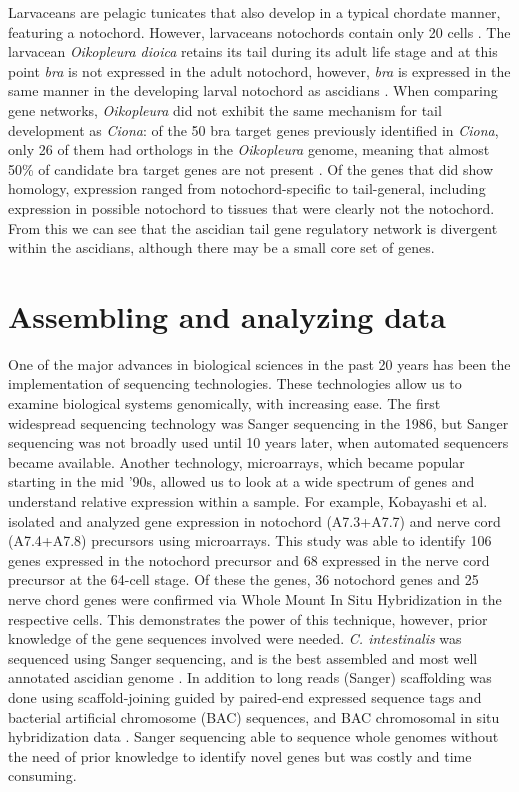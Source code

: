 Larvaceans are pelagic tunicates that also develop in a typical chordate manner, featuring  a notochord. However, larvaceans notochords contain only 20 cells \cite{seo_miniature_2001,denoeud_plasticity_2010}. The larvacean  \textit{Oikopleura dioica} retains its tail during its adult life stage and at this point \textit{bra} is not expressed in the adult notochord, however, \textit{bra} is expressed in the same manner in the developing larval notochord as ascidians \cite{bassham_brachyury_2000,nishida_development_2008}. When comparing gene networks, \textit{Oikopleura} did not exhibit the same mechanism for tail development as \textit{Ciona}: of the 50 bra target genes previously identified in \textit{Ciona}, only 26 of them had orthologs in the \textit{Oikopleura} genome, meaning that almost 50\% of candidate bra target  genes are not present \cite{kugler_evolutionary_2011}. Of the genes that did show homology, expression ranged from notochord-specific to tail-general, including expression in possible notochord to tissues that were clearly not the notochord. From this we can see that the ascidian tail gene regulatory network is divergent within the ascidians, although there may be a small core set of genes.

\section{Assembling and analyzing data}

One of the major advances in biological sciences in the past 20 years has been the implementation of sequencing technologies. These technologies allow us to examine biological systems genomically, with increasing ease. The first widespread sequencing technology was Sanger sequencing in the 1986, but Sanger sequencing was not broadly used until 10 years later, when automated sequencers became available. Another technology, microarrays, which became popular starting in the mid '90s, allowed us to look at a wide spectrum of genes and understand relative expression within a sample. For example, Kobayashi et al. \cite{kobayashi_differential_2013} isolated and analyzed gene expression in notochord (A7.3+A7.7) and nerve cord (A7.4+A7.8) precursors using microarrays. This study was able to identify 106 genes expressed in the notochord precursor and 68 expressed in the nerve cord precursor at the 64-cell stage. Of these the genes, 36 notochord genes and 25 nerve chord genes were confirmed via Whole Mount In Situ Hybridization in the respective cells. This demonstrates the power of this technique, however, prior knowledge of the gene sequences involved were needed. \textit{C. intestinalis} was sequenced using Sanger sequencing, and is the best assembled and most well annotated ascidian genome \cite{dehal_draft_2002}. In addition to long reads (Sanger) scaffolding was done using scaffold-joining guided by paired-end expressed sequence tags and bacterial artificial chromosome (BAC) sequences, and BAC chromosomal in situ hybridization data \cite{satou_improved_2008}. Sanger sequencing able to sequence whole genomes without the need of prior knowledge to identify novel genes but was costly and time consuming\cite{metzker_emerging_2005,liu_comparison_2012}. 

